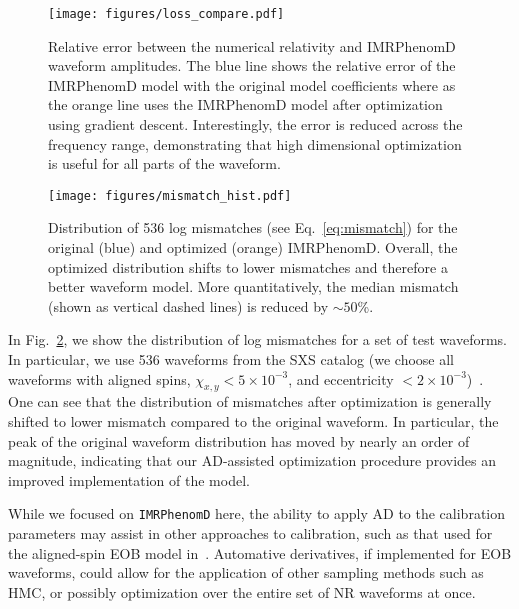 \documentclass[twocolumn]{aastex631}
\begin{document}
\begin{figure}[t]
	\begin{centering}
		\texttt{[image: figures/loss\_compare.pdf]}
		\caption{
			Relative error between the numerical relativity and IMRPhenomD waveform amplitudes. 
            The blue line shows the relative error of the IMRPhenomD model with the original model coefficients where as the orange line uses the IMRPhenomD model after optimization using gradient descent.
            Interestingly, the error is reduced across the frequency range, demonstrating that high dimensional optimization is useful for all parts of the waveform.
        }
		\label{fig:loss_compare}
	\end{centering}
\end{figure}

\begin{figure}[t]
	\begin{centering}
		\texttt{[image: figures/mismatch\_hist.pdf]}
		\caption{
			Distribution of 536 log mismatches (see Eq.~\eqref{eq:mismatch}) for the original (blue) and optimized (orange) IMRPhenomD. 
            Overall, the optimized distribution shifts to lower mismatches and therefore a better waveform model. 
            More quantitatively, the median mismatch (shown as vertical dashed lines) is reduced by $\sim50$\%. 
		}
		\label{fig:mismatch_hist}
	\end{centering}
\end{figure}
 
In Fig.~\ref{fig:mismatch_hist}, we show the distribution of log mismatches for a set of test waveforms.
In particular, we use 536 waveforms from the SXS catalog (we choose all waveforms with aligned spins, $\chi_{x,y}<5\times 10^{-3}$, and eccentricity $<2\times 10^{-3}$)~\citep{Boyle:2019kee}.
One can see that the distribution of mismatches after optimization is generally shifted to lower mismatch compared to the original waveform.
In particular, the peak of the original waveform distribution has moved by nearly an order of magnitude, indicating that our AD-assisted optimization procedure provides an improved implementation of the model.

While we focused on \texttt{IMRPhenomD} here, the ability to apply AD to the calibration parameters may assist in other approaches to calibration, such as that used for the aligned-spin EOB model in~\citet{Bohe:2016gbl}.
Automative derivatives, if implemented for EOB waveforms, could allow for the application of other sampling methods such as HMC, or possibly optimization over the entire set of NR waveforms at once.
\end{document}
